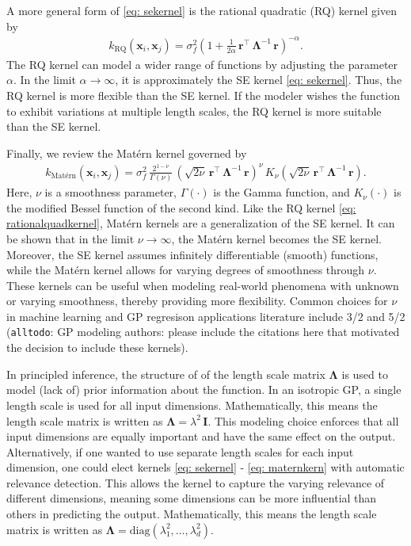 \documentclass[journal=jacsat,manuscript=article, ]{achemso}
\newcommand{\alltodo}[1]{{\color{Cyan} (\texttt{alltodo}: #1)}}
\newcommand{\xvec}{\ensuremath{\mathbf{x}}}
\begin{document}
 A more general form of \eqref{eq: sekernel} is the rational quadratic (RQ) kernel given by
 \begin{gather}
     k_{\text{RQ}}(\xvec_i,\xvec_j) = \sigma_f^2 \left(1 +\frac{1}{2 \alpha} \,\mathbf{r}^\intercal \,\boldsymbol{\Lambda}^{-1} \,\mathbf{r} \right)^{-\alpha}. \label{eq: rationalquadkernel}
 \end{gather}
 The RQ kernel can model a wider range of functions by adjusting the parameter $\alpha$. In the limit $\alpha \rightarrow \infty$, it is approximately the SE kernel \eqref{eq: sekernel}. Thus, the RQ kernel is more flexible than the SE kernel. If the modeler wishes the function to exhibit variations at multiple length scales, the RQ kernel is more suitable than the SE kernel.

 Finally, we review the Mat\'ern kernel governed by
 \begin{gather}
     k_{\text{Mat\'ern}}(\xvec_i,\xvec_j) = \sigma_f^2 \,\frac{2^{1-\nu}}{\Gamma(\nu)} \, \left(\sqrt{2\nu} \, \mathbf{r}^\intercal \,\boldsymbol{\Lambda}^{-1} \,\mathbf{r} \right)^{\nu}\, K_\nu  \left(\sqrt{2\nu} \, \mathbf{r}^\intercal \,\boldsymbol{\Lambda}^{-1} \,\mathbf{r} \right). \label{eq: maternkern}
 \end{gather}
 Here, $\nu$ is a smoothness parameter, $\Gamma(\cdot)$ is the Gamma function, and $K_\nu(\cdot)$ is the modified Bessel function of the second kind. Like the RQ kernel \eqref{eq: rationalquadkernel}, Matérn kernels are a generalization of the SE kernel. It can be shown that in the limit $\nu \rightarrow \infty$, the Mat\'ern kernel becomes the SE kernel. Moreover, the SE kernel assumes infinitely differentiable (smooth) functions, while the Matérn kernel allows for varying degrees of smoothness through $\nu$. These kernels can be useful when modeling real-world phenomena with unknown or varying smoothness, thereby providing more flexibility. Common choices for $\nu$ in machine learning and GP regresison applications literature include 3/2 and 5/2 \alltodo{GP modeling authors: please include the citations here that motivated the decision to include these kernels}. 

 In principled inference, the structure of of the length scale matrix $\boldsymbol{\Lambda}$ is used to model (lack of) prior information about the function. In an isotropic GP, a single length scale is used for all input dimensions. Mathematically, this means the length scale matrix is written as $\boldsymbol{\Lambda} = \lambda^2 \, \mathbf{I}$. This modeling choice enforces that all input dimensions are equally important and have the same effect on the output. Alternatively, if one wanted to use separate length scales for each input dimension, one could elect kernels \eqref{eq: sekernel} - \eqref{eq: maternkern} with automatic relevance detection. This allows the kernel to capture the varying relevance of different dimensions, meaning some dimensions can be more influential than others in predicting the output. Mathematically, this means the length scale matrix is written as $\boldsymbol{\Lambda} = \text{diag}(\lambda_1^2,\dots,\lambda_d^2)$.
\end{document}
